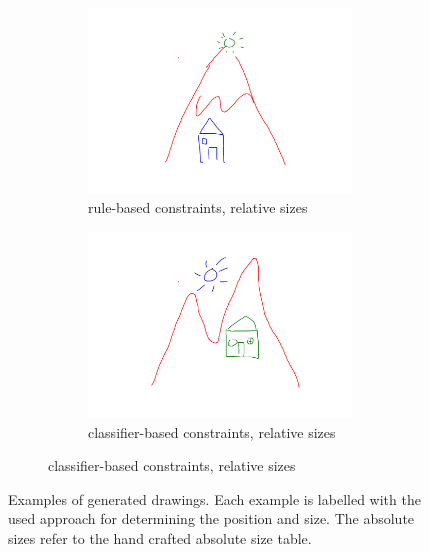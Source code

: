 \begin{figure}[ht]
\begin{subfigure}{\textwidth}
\begin{subfigure}{0.45\textwidth}
            \end{subfigure}
        \end{subfigure}
        \begin{subfigure}{\textwidth}
            \centering
            \caption{(3) }
            \begin{subfigure}[t]{0.45\textwidth}
                \includegraphics[width=\textwidth]{figures/drawing_3_rr.pdf} 
                \caption{rule-based constraints, relative sizes}
            \end{subfigure}
            \hfill
            \begin{subfigure}[t]{0.45\textwidth}
                \includegraphics[width=\textwidth]{figures/drawing_3_cr.pdf}
                \caption{classifier-based constraints, relative sizes}
            \end{subfigure}
        \end{subfigure}
    \caption[Examples of generated drawings]{Examples of generated drawings. Each example is labelled with the used approach for determining the position and size. The absolute sizes refer to the hand crafted absolute size table.}
    \label{fig:composed_drawings}
\end{figure}
